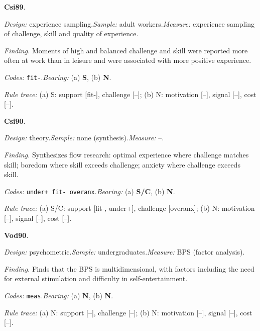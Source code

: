 \medskip
{}
\noindent\textbf{Csi89}\enspace \citet{CsikszentmihalyiLeFevre1989}.\par
{\small\noindent\textit{Design:} experience sampling.\quad \textit{Sample:} adult workers.\quad \textit{Measure:} experience sampling of challenge, skill and quality of experience.\par
\noindent\textit{Finding.} Moments of high and balanced challenge and skill were reported more often at work than in leisure and were associated with more positive experience.\par
\noindent\textit{Codes:} \texttt{fit-}.\quad \textit{Bearing:} (a) \textbf{S}, (b) \textbf{N}.\par
\noindent\textit{Rule trace:} (a) S: support {[}fit-{]}, challenge {[}--{]}; (b) N: motivation {[}--{]}, signal {[}--{]}, cost {[}--{]}.\par}
\medskip
{}
\noindent\textbf{Csi90}\enspace \citet{Csikszentmihalyi1990}.\par
{\small\noindent\textit{Design:} theory.\quad \textit{Sample:} none (synthesis).\quad \textit{Measure:} --.\par
\noindent\textit{Finding.} Synthesizes flow research: optimal experience where challenge matches skill; boredom where skill exceeds challenge; anxiety where challenge exceeds skill.\par
\noindent\textit{Codes:} \texttt{under+ fit- overanx}.\quad \textit{Bearing:} (a) \textbf{S/C}, (b) \textbf{N}.\par
\noindent\textit{Rule trace:} (a) S/C: support {[}fit-, under+{]}, challenge {[}overanx{]}; (b) N: motivation {[}--{]}, signal {[}--{]}, cost {[}--{]}.\par}
\medskip
{}
\noindent\textbf{Vod90}\enspace \citet{VodanovichKass1990}.\par
{\small\noindent\textit{Design:} psychometric.\quad \textit{Sample:} undergraduates.\quad \textit{Measure:} BPS (factor analysis).\par
\noindent\textit{Finding.} Finds that the BPS is multidimensional, with factors including the need for external stimulation and difficulty in self-entertainment.\par
\noindent\textit{Codes:} \texttt{meas}.\quad \textit{Bearing:} (a) \textbf{N}, (b) \textbf{N}.\par
\noindent\textit{Rule trace:} (a) N: support {[}--{]}, challenge {[}--{]}; (b) N: motivation {[}--{]}, signal {[}--{]}, cost {[}--{]}.\par}
